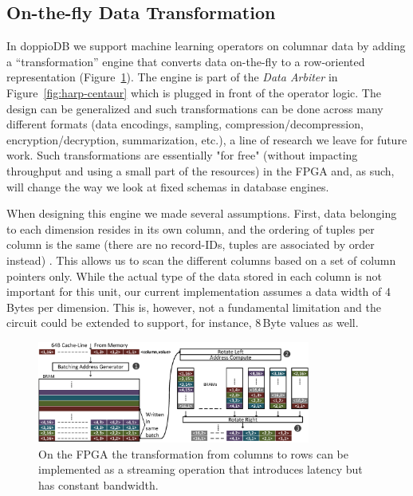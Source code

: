 \documentclass[11pt,dvipdfm]{article}
\begin{document}



\subsection{On-the-fly Data Transformation}
\label{sec:gather-engine}

In doppioDB we support machine learning operators on columnar data by adding a ``transformation'' engine that converts data on-the-fly to a row-oriented representation (Figure~\ref{fig:gather}). The engine is part of the \emph{Data Arbiter} in Figure~\ref{fig:harp-centaur} which is plugged in front of the operator logic. The design can be generalized and such transformations can be done across many different formats (data encodings, sampling, compression/decompression, encryption/decryption, summarization, etc.), a line of research we leave for future work. Such transformations are essentially "for free" (without impacting throughput and using a small part of the resources) in the FPGA   and, as such, will change the way we look at fixed schemas in database engines.

When designing this engine we made several assumptions. First, data belonging to each dimension resides in its own column, and the ordering of tuples per column is the same (there are no record-IDs, tuples are associated by order instead) . This allows us to scan the different columns based on a set of column pointers only. While the actual type of the data stored in each column is not important for this unit, our current implementation assumes a data width of 4\,Bytes per dimension. This is, however, not a fundamental limitation and the circuit could be extended to support, for instance, 8\,Byte values as well. 

\begin{figure}[t]
    \centering
	\includegraphics[width=0.8\textwidth]{figs/GATHER2.eps}
	\caption{On the FPGA the transformation from columns to rows can be implemented as a streaming operation that introduces latency but has constant bandwidth.}
	\label{fig:gather}
\end{figure}
\end{document}
